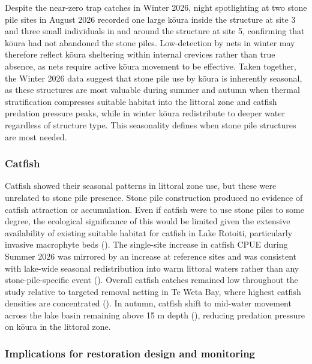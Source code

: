 \documentclass[
  letterpaper,
  DIV=11,
  numbers=noendperiod]{scrartcl}
\begin{document}
Despite the near-zero trap catches in Winter 2026, night spotlighting at
two stone pile sites in August 2026 recorded one large kōura inside the
structure at site 3 and three small individuals in and around the
structure at site 5, confirming that kōura had not abandoned the stone
piles. Low-detection by nets in winter may therefore reflect kōura
sheltering within internal crevices rather than true absence, as nets
require active kōura movement to be effective. Taken together, the
Winter 2026 data suggest that stone pile use by kōura is inherently
seasonal, as these structures are most valuable during summer and autumn
when thermal stratification compresses suitable habitat into the
littoral zone and catfish predation pressure peaks, while in winter
kōura redistribute to deeper water regardless of structure type. This
seasonality defines when stone pile structures are most needed.

\subsubsection{Catfish}\label{catfish}

Catfish showed their seasonal patterns in littoral zone use, but these
were unrelated to stone pile presence. Stone pile construction produced
no evidence of catfish attraction or accumulation. Even if catfish were
to use stone piles to some degree, the ecological significance of this
would be limited given the extensive availability of existing suitable
habitat for catfish in Lake Rotoiti, particularly invasive macrophyte
beds (). The single-site
increase in catfish CPUE during Summer 2026 was mirrored by an increase
at reference sites and was consistent with lake-wide seasonal
redistribution into warm littoral waters rather than any
stone-pile-specific event (). Overall catfish catches remained low throughout the study
relative to targeted removal netting in Te Weta Bay, where highest
catfish densities are concentrated (). In autumn, catfish shift to mid-water movement across the lake
basin remaining above 15 m depth
(), reducing
predation pressure on kōura in the littoral zone.

\subsubsection{Implications for restoration design and
monitoring}\label{implications-for-restoration-design-and-monitoring}
\end{document}
